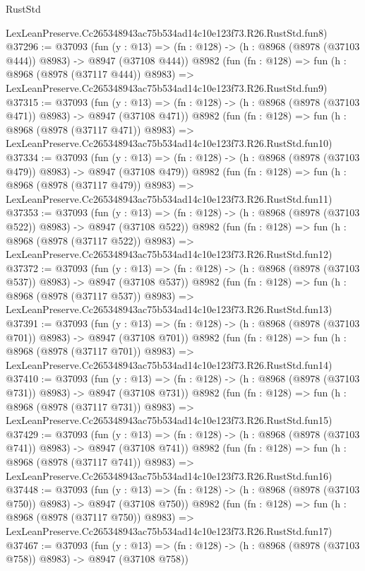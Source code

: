\begin{lexlean}{RustStd}
\begin{coremodule}
    LexLeanPreserve.Cc265348943ac75b534ad14c10e123f73.R26.RustStd.fun8)
@37296 := @37093
    (fun (y : @13) => (fn : @128) -> (h : @8968 (@8978 (@37103 @444)) @8983) -> @8947 (@37108 @444))
    @8982
    (fun (fn : @128) =>
    fun (h : @8968 (@8978 (@37117 @444)) @8983) =>
    LexLeanPreserve.Cc265348943ac75b534ad14c10e123f73.R26.RustStd.fun9)
@37315 := @37093
    (fun (y : @13) => (fn : @128) -> (h : @8968 (@8978 (@37103 @471)) @8983) -> @8947 (@37108 @471))
    @8982
    (fun (fn : @128) =>
    fun (h : @8968 (@8978 (@37117 @471)) @8983) =>
    LexLeanPreserve.Cc265348943ac75b534ad14c10e123f73.R26.RustStd.fun10)
@37334 := @37093
    (fun (y : @13) => (fn : @128) -> (h : @8968 (@8978 (@37103 @479)) @8983) -> @8947 (@37108 @479))
    @8982
    (fun (fn : @128) =>
    fun (h : @8968 (@8978 (@37117 @479)) @8983) =>
    LexLeanPreserve.Cc265348943ac75b534ad14c10e123f73.R26.RustStd.fun11)
@37353 := @37093
    (fun (y : @13) => (fn : @128) -> (h : @8968 (@8978 (@37103 @522)) @8983) -> @8947 (@37108 @522))
    @8982
    (fun (fn : @128) =>
    fun (h : @8968 (@8978 (@37117 @522)) @8983) =>
    LexLeanPreserve.Cc265348943ac75b534ad14c10e123f73.R26.RustStd.fun12)
@37372 := @37093
    (fun (y : @13) => (fn : @128) -> (h : @8968 (@8978 (@37103 @537)) @8983) -> @8947 (@37108 @537))
    @8982
    (fun (fn : @128) =>
    fun (h : @8968 (@8978 (@37117 @537)) @8983) =>
    LexLeanPreserve.Cc265348943ac75b534ad14c10e123f73.R26.RustStd.fun13)
@37391 := @37093
    (fun (y : @13) => (fn : @128) -> (h : @8968 (@8978 (@37103 @701)) @8983) -> @8947 (@37108 @701))
    @8982
    (fun (fn : @128) =>
    fun (h : @8968 (@8978 (@37117 @701)) @8983) =>
    LexLeanPreserve.Cc265348943ac75b534ad14c10e123f73.R26.RustStd.fun14)
@37410 := @37093
    (fun (y : @13) => (fn : @128) -> (h : @8968 (@8978 (@37103 @731)) @8983) -> @8947 (@37108 @731))
    @8982
    (fun (fn : @128) =>
    fun (h : @8968 (@8978 (@37117 @731)) @8983) =>
    LexLeanPreserve.Cc265348943ac75b534ad14c10e123f73.R26.RustStd.fun15)
@37429 := @37093
    (fun (y : @13) => (fn : @128) -> (h : @8968 (@8978 (@37103 @741)) @8983) -> @8947 (@37108 @741))
    @8982
    (fun (fn : @128) =>
    fun (h : @8968 (@8978 (@37117 @741)) @8983) =>
    LexLeanPreserve.Cc265348943ac75b534ad14c10e123f73.R26.RustStd.fun16)
@37448 := @37093
    (fun (y : @13) => (fn : @128) -> (h : @8968 (@8978 (@37103 @750)) @8983) -> @8947 (@37108 @750))
    @8982
    (fun (fn : @128) =>
    fun (h : @8968 (@8978 (@37117 @750)) @8983) =>
    LexLeanPreserve.Cc265348943ac75b534ad14c10e123f73.R26.RustStd.fun17)
@37467 := @37093
    (fun (y : @13) => (fn : @128) -> (h : @8968 (@8978 (@37103 @758)) @8983) -> @8947 (@37108 @758))

\end{coremodule}
\end{lexlean}
